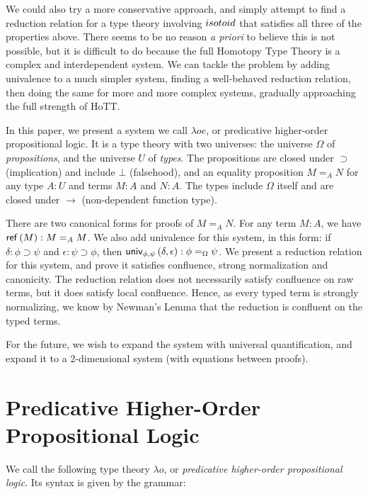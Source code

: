 We could also try a more conservative approach, and simply attempt to find a reduction relation for a type theory involving $isotoid$ that satisfies
all three of the properties above.  There seems to be no reason \emph{a priori} to believe this is not possible, but it is difficult to do because
the full Homotopy Type Theory is a complex and interdependent system.  We can tackle the problem by adding univalence to a much simpler system, finding
a well-behaved reduction relation, then doing the same for more and more complex systems, gradually approaching the full strength of HoTT.

In this paper, we present a system we call $\lambda o e$, or predicative higher-order propositional logic.  It is a type theory with two universes: the universe $\Omega$
of \emph{propositions}, and the universe $U$ of \emph{types}.  The propositions are closed under $\supset$ (implication) and include $\bot$ (falsehood), and an equality proposition $M =_A N$ for
any type $A : U$ and terms $M : A$ and $N : A$.  The types include $\Omega$ itself and are closed under $\rightarrow$ (non-dependent function type).

There are two canonical forms for proofs of $M =_A N$.  For any term $M : A$, we have $\mathsf{ref} \left( {M} \right) : M =_A M$.  We also add univalence for this system, in this form:
if $\delta : \phi \supset \psi$ and $\epsilon : \psi \supset\phi$, then $\mathsf{univ}_{{\phi} , {\psi}} \left( {\delta} , {\epsilon} \right) : \phi =_\Omega \psi$.  We present a reduction relation for this system, and prove it satisfies confluence, strong normalization and canonicity.   The reduction relation does not necessarily satisfy confluence on raw terms, but it does satisfy local confluence.  Hence, as
every typed term is strongly normalizing, we know by Newman's Lemma that the reduction is confluent on the typed terms.

For the future, we wish to expand the system with universal quantification, and expand it to a 2-dimensional system (with equations between proofs).


\section{Predicative Higher-Order Propositional Logic}

We call the following type theory $\lambda o$, or \emph{predicative higher-order propositional logic}.  Its
syntax is given by the grammar:


